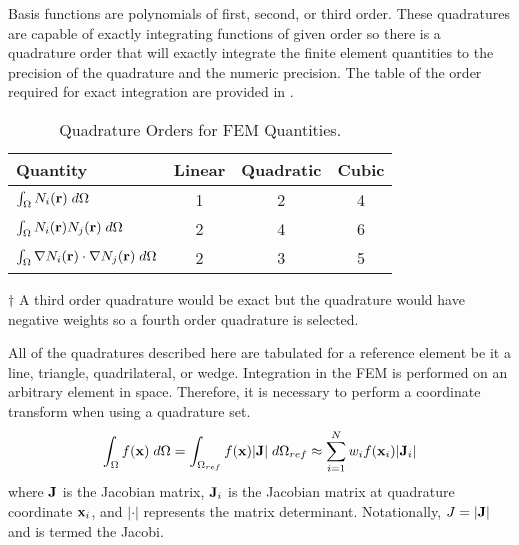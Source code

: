     Basis functions are polynomials of first, second, or third order. These 
    quadratures are capable of exactly integrating functions of given order so 
    there is a quadrature order that will exactly integrate the finite element 
    quantities to the precision of the quadrature and the numeric precision. The
    table of the order required for exact integration are provided in 
    .
    \begin{table}
      \begin{center}
        \caption{Quadrature Orders for FEM Quantities.}
        \label{tab:quadrature_orders}
        \begin{threeparttable}
          \begin{tabular}{lccc}
            \toprule
            Quantity & Linear & Quadratic & Cubic \\
            \midrule
            $\int_{\Omega} N_i(\mathbf{r}) \;d\Omega$ & 1 & 2 & 4
              \tnote{$\dagger$} \\
            $\int_{\Omega} N_i(\mathbf{r}) N_j(\mathbf{r}) \;d\Omega$ &
              2 & 4 & 6 \\
            $\int_{\Omega} \mathbf{\nabla} N_i(\mathbf{r}) \cdot \mathbf{\nabla} N_j(\mathbf{r}) 
              \;d\Omega$ & 2 & 3 & 5 \\
            \bottomrule
          \end{tabular}
          \begin{tablenotes}
            \item[$\dagger$] A third order quadrature would be exact but the 
              quadrature would have negative weights so a fourth order 
              quadrature is selected.
          \end{tablenotes}
        \end{threeparttable}
      \end{center}
    \end{table}
    
    All of the quadratures described here are tabulated for a reference element
    be it a line, triangle, quadrilateral, or wedge. Integration in the 
    FEM is performed on an arbitrary element in space. Therefore, it is 
    necessary to perform a coordinate transform when using a quadrature set.
    \begin{equation}
      \int_{\Omega} f(\mathbf{x}) \;d\Omega = 
        \int_{\Omega_{ref}} f(\mathbf{x}) \lvert \mathbf{J} \rvert \;d\Omega_{ref} \approx
        \sum_{i=1}^{N} w_i f(\mathbf{x}_i) \lvert \mathbf{J}_i \rvert
    \end{equation}
    where $\mathbf{J}$ is the Jacobian matrix, $\mathbf{J}_i$ is the Jacobian matrix at 
    quadrature coordinate $\mathbf{x}_i$, and $\lvert \cdot \rvert$ represents
    the matrix determinant. Notationally, $J=\lvert \mathbf{J} \rvert$ and is termed
    the Jacobi.

